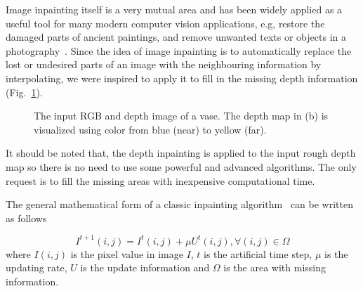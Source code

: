 Image inpainting itself is a very mutual area and has been widely applied as a useful tool for many modern computer vision applications, e.g, restore the damaged parts of ancient paintings, and remove unwanted texts or objects in a photography~\cite{bertalmio2000image}. 
Since the idea of image inpainting is to automatically replace the lost or undesired parts of an image with the neighbouring information by interpolating, we were inspired to apply it to fill in the missing depth information (Fig.~\ref{fig:inpainting1}).

\begin{figure}[!htbp]
\centering
{}
\caption{The input RGB and depth image of a vase. The depth map in (b) is visualized using color from blue (near) to yellow (far).}
\label{fig:inpainting1}
\end{figure}

It should be noted that, the depth inpainting is applied to the input rough depth map so there is no need to use some powerful and advanced algorithms.
The only request is to fill the missing areas with inexpensive computational time.

The general mathematical form of a classic inpainting algorithm~\cite{bertalmio2000image} can be written as follows

\begin{equation}\label{eq:method_inpaint1}
I^{t+1}(i,j) = I^{t}(i,j) + \mu U^{t}(i,j), \forall(i,j)\in \Omega
\end{equation}
where $I(i,j)$ is the pixel value in image $I$, $t$ is the artificial time step, $\mu$ is the updating rate, $U$ is the update information and $\Omega$ is the area with missing information.

